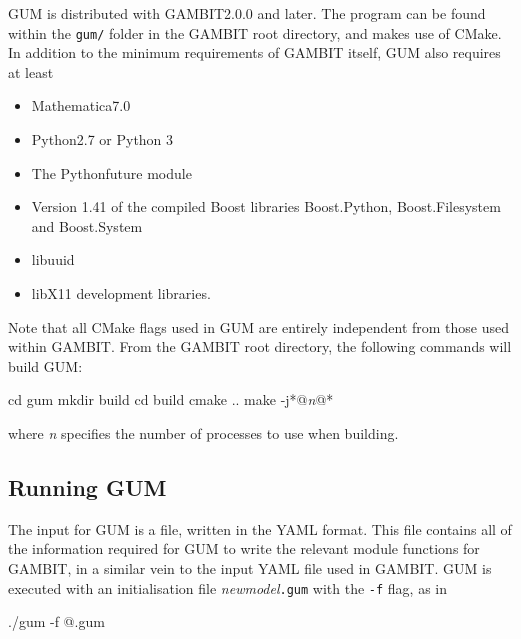 \documentclass[pdftex,twocolumn,epjc3_preprint,runningheads]{svjour3}
\renewcommand{\_}{\discretionary{\underscore}{}{\underscore}}
\newcommand\term[1]{{\lstset{style=terminal}\lstinline!#1!\lstset{style=cpp}}}
\newcommand{\metavarf}[1]{\textit{\color{darkgreen}\footnotesize\textrm{#1}}}
\newcommand{\metavar}{\metavarf}
\newcommand{\gambit}{\textsf{GAMBIT}\xspace}
\newcommand{\GB}{\gambit}
\newcommand\Mathematica{\textsf{Mathematica}\xspace}
\newcommand{\gum}{\textsf{GUM}\xspace}
\newcommand{\dgum}{\!\!\term{.gum}\!\xspace}
\newcommand\Python{\textsf{Python}\xspace}
\newcommand\python{\Python}
\newcommand\YAML{\textsf{YAML}\xspace}
\newcommand\cmake{\textsf{CMake}\xspace}
\newcommand{\nm}{\metavar{new\_model}}
\begin{document}
\gum is distributed with \GB \textsf{2.0.0} and later. The program can be found within the \term{gum/} folder in the \GB root directory, and makes use of \cmake. In addition to the minimum requirements of \GB itself, \gum also requires at least
%
\begin{itemize}
 \item \Mathematica \textsf{7.0}
 \item \python \textsf{2.7} or \python 3
 \item The \python \textsf{future} module
 \item Version \textsf{1.41} of the compiled \textsf{Boost} libraries \textsf{Boost.Python}, \textsf{Boost.Filesystem} and \textsf{Boost.System}
 \item \textsf{libuuid}
 \item \textsf{libX11} development libraries.
\end{itemize}

Note that all \cmake flags used in \gum are entirely independent from those used within \GB. From the \GB root directory, the following commands will build \gum:
%
\begin{lsttermalt}
cd gum
mkdir build
cd build
cmake ..
make -j*@\metavar{n}@*
\end{lsttermalt}
%
where \metavar{n} specifies the number of processes to use when building. %

\subsection{Running \gum} \label{sec:running_gum}

The input for \gum is a \dgum file, written in the \YAML format. This file contains all of the information required for \gum to write the relevant module functions for \GB, in a similar vein to the input \YAML file used in \GB. \gum is executed with an initialisation file \nm\term{.gum} with the \term{-f} flag, as in
%
\begin{lstterm}
./gum -f @\nm@.gum
\end{lstterm}
\end{document}
